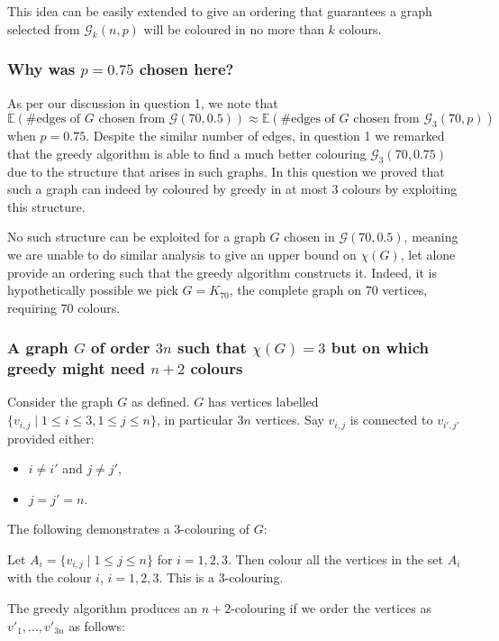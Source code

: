 \documentclass{article}
\begin{document}
This idea can be easily extended to give an ordering that guarantees a graph selected from $\mathcal{G}_k(n, p)$ will be coloured in no more than $k$ colours.


\subsubsection{Why was $p=0.75$ chosen here?}

As per our discussion in question 1, we note that $$\mathbb{E}(\text{\#edges of $G$ chosen from $\mathcal{G}(70, 0.5)$}) \approx \mathbb{E}(\text{\#edges of $G$ chosen from $\mathcal{G}_3(70, p)$})$$ when $p=0.75$. Despite the similar number of edges, in question 1 we remarked that the greedy algorithm is able to find a much better colouring $\mathcal{G}_3(70, 0.75)$ due to the structure that arises in such graphs. In this question we proved that such a graph can indeed by coloured by greedy in at most $3$ colours by exploiting this structure.

No such structure can be exploited for a graph $G$ chosen in $\mathcal{G}(70, 0.5)$, meaning we are unable to do similar analysis to give an upper bound on $\chi(G)$, let alone provide an ordering such that the greedy algorithm constructs it. Indeed, it is hypothetically possible we pick $G = K_{70}$, the complete graph on $70$ vertices, requiring $70$ colours.

\subsubsection{A graph $G$ of order $3n$ such that $\chi(G) = 3$ but on which greedy might need $n + 2$ colours}

Consider the graph $G$ as defined. $G$ has vertices labelled $\{ v_{i,j} \mid 1 \leq i \leq 3, 1 \leq j \leq n\}$, in particular $3n$ vertices. Say $v_{i,j}$ is connected to $v_{i',j'}$ provided either:

\begin{itemize}
	\item $i \neq i'$ and $j \neq j'$,
	\item $j = j' = n$.
\end{itemize}

The following demonstrates a $3$-colouring of $G$:

Let $A_i = \{v_{i, j} \mid 1 \leq j \leq n \}$ for $i = 1, 2, 3$. Then colour all the vertices in the set $A_i$ with the colour $i$, $i=1,2,3$. This is a $3$-colouring.

The greedy algorithm produces an $n+2$-colouring if we order the vertices as $v'_1, \dots, v'_{3n}$ as follows:
\end{document}
